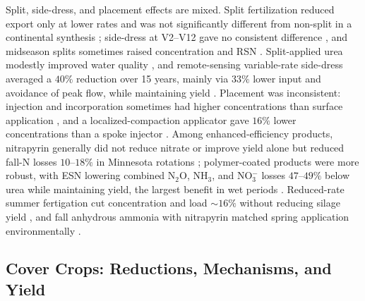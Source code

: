 Split, side-dress, and placement effects are mixed. Split fertilization
reduced export only at lower rates \parencite{Liu2021} and was not
significantly different from non-split in a continental synthesis
\parencite{Hertzberger2019}; side-dress at V2--V12 gave no consistent
difference \parencite{Jaynes2013}, and midseason splits sometimes raised
concentration and RSN \parencite{Jaynes2006,Bandura2025}. Split-applied urea
modestly improved water quality \parencite{Waring2022}, and remote-sensing
variable-rate side-dress averaged a $40\%$ reduction over 15 years, mainly via
$33\%$ lower input and avoidance of peak flow, while maintaining yield
\parencite{Wilson2020b}. Placement was inconsistent: injection and
incorporation sometimes had higher concentrations than surface application
\parencite{Hertzberger2019}, and a localized-compaction applicator gave $16\%$
lower concentrations than a spoke injector \parencite{Bakhsh2010}. Among
enhanced-efficiency products, nitrapyrin generally did not reduce nitrate or
improve yield alone \parencite{Vetsch2019,Pittelkow2017} but reduced fall-N
losses $10$--$18\%$ in Minnesota rotations \parencite{Randall2003,Randall2005};
polymer-coated products were more robust, with ESN lowering combined N$_2$O,
NH$_3$, and NO$_3^-$ losses $47$--$49\%$ below urea while maintaining yield,
the largest benefit in wet periods \parencite{Menegaz2025,Nash2015,Nash2015b}.
Reduced-rate summer fertigation cut concentration and load $\sim16\%$ without
reducing silage yield \parencite{Gamble2018}, and fall anhydrous ammonia with
nitrapyrin matched spring application environmentally \parencite{Kaur2024,Kaur2024c}.

\subsection{Cover Crops: Reductions, Mechanisms, and Yield}

